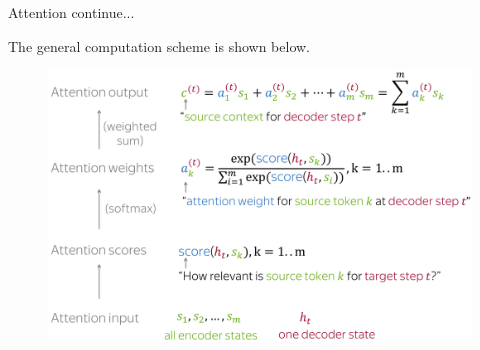 \documentclass{beamer}
\begin{document}
\begin{frame}{Attention continue...}

The general computation scheme is shown below.\renewcommand{\thefootnote}{}
\renewcommand{\thefootnote}{\arabic{footnote}}


\begin{figure}
    \centering
    \includegraphics[width=0.8\linewidth]{f10.png}
    \label{fig:enter-label}
\end{figure}
    
\end{frame}
\end{document}
